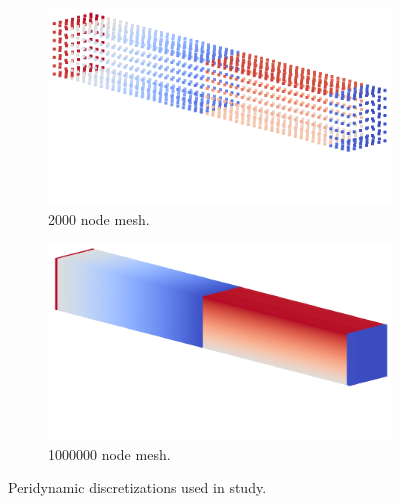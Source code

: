 \documentclass[preprint,12pt]{elsarticle}
\begin{document}
\begin{figure}[tbp] 
    \centering 
    \begin{subfigure}[b]{0.4\textwidth}
        \includegraphics[width=\textwidth]{./figs/mesh2000_replacement.png}
        \caption{2000 node mesh.}
        \label{fig:SCMesh}
    \end{subfigure}
    \begin{subfigure}[b]{0.4\textwidth}
        \includegraphics[width=\textwidth]{./figs/mesh1000000_replacement.png}
        \caption{1000000 node mesh.}
        \label{fig:MCMesh}
    \end{subfigure}
    \caption{Peridynamic discretizations used in study.}
    \label{fig:pd_discrete}
\end{figure}
\end{document}
